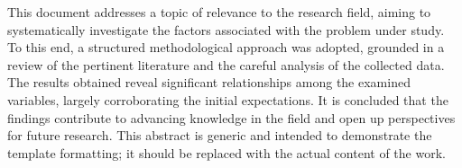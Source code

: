 %

This document addresses a topic of relevance to the research field, aiming to systematically investigate the factors associated with the problem under study. To this end, a structured methodological approach was adopted, grounded in a review of the pertinent literature and the careful analysis of the collected data. The results obtained reveal significant relationships among the examined variables, largely corroborating the initial expectations. It is concluded that the findings contribute to advancing knowledge in the field and open up perspectives for future research. This abstract is generic and intended to demonstrate the template formatting; it should be replaced with the actual content of the work.

